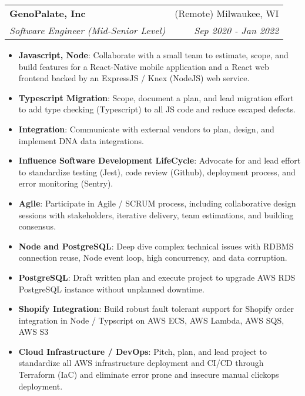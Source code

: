 \documentclass[letterpaper,11pt]{article}
\makeatletter
\newcommand{\resumeItem}[2]{
  \item\small{
    \textbf{#1}{: #2 \vspace{-2pt}}
  }
}
\newcommand{\resumeSubheading}[4]{
  \vspace{-1pt}\item
    \begin{tabular*}{0.97\textwidth}{l@{\extracolsep{\fill}}r}
      \textbf{#1} & #2 \\
      \textit{\small#3} & \textit{\small #4} \\
    \end{tabular*}\vspace{-5pt}
}
\newcommand{\resumeItemListStart}{\begin{itemize}}
\newcommand{\resumeItemListEnd}{\end{itemize}\vspace{-5pt}}
\makeatother
\begin{document}
    \resumeSubheading
      {GenoPalate, Inc}{(Remote) Milwaukee, WI}
      {Software Engineer (Mid-Senior Level)}{Sep 2020 - Jan 2022}
      \resumeItemListStart
        \resumeItem{Javascript, Node}
          {Collaborate with a small team to estimate, scope, and build features for a React-Native mobile application and a React web frontend backed by an ExpressJS / Knex (NodeJS) web service.}
        \resumeItem{Typescript Migration}
          {Scope, document a plan, and lead migration effort to add type checking (Typescript) to all JS code and reduce escaped defects.}
        \resumeItem{Integration}
          {Communicate with external vendors to plan, design, and implement DNA data integrations.}
        \resumeItem{Influence Software Development LifeCycle}
          {Advocate for and lead effort to standardize testing (Jest), code review (Github), deployment process, and error monitoring (Sentry).}
        \resumeItem{Agile}
          {Participate in Agile / SCRUM process, including collaborative design sessions with stakeholders, iterative delivery, team estimations, and building consensus.}
        \resumeItem{Node and PostgreSQL}
          {Deep dive complex technical issues with RDBMS connection reuse, Node event loop, high concurrency, and data corruption.}
        \resumeItem{PostgreSQL}
          {Draft written plan and execute project to upgrade AWS RDS PostgreSQL instance without unplanned downtime.}
        \resumeItem{Shopify Integration}
          {Build robust fault tolerant support for Shopify order integration in Node / Typscript on AWS ECS, AWS Lambda, AWS SQS, AWS S3}
        \resumeItem{Cloud Infrastructure / DevOps}
          {Pitch, plan, and lead project to standardize all AWS infrastructure deployment and CI/CD through Terraform (IaC) and eliminate error prone and insecure manual clickops deployment.}
      \resumeItemListEnd
\end{document}
